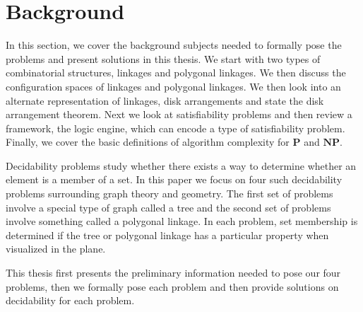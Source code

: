 \chapter{Background}
In this section, we cover the background subjects needed to formally pose the 
problems and present solutions in this thesis.  We start with two types of combinatorial structures, linkages 
and polygonal linkages.  We then discuss the configuration spaces of linkages and polygonal 
linkages.   We then look into an alternate representation of linkages, disk arrangements and state 
the disk arrangement theorem.  Next we look at satisfiability problems and then review a framework, the 
logic engine, which can encode a type of satisfiability problem.  Finally, we cover the basic 
definitions of algorithm complexity for $\textbf{P}$ and $\textbf{NP}$.

Decidability problems study whether there exists a way to determine whether an element is a member of a set.  In this paper we focus on four such decidability problems surrounding graph theory and geometry. The first set of problems involve a special type of graph called a tree and the second set of problems involve something called a polygonal linkage.  In each problem, set membership is determined if the tree or polygonal linkage has a particular property when visualized in the plane. 

This thesis first presents the preliminary information needed to pose our four problems, then we formally pose each problem and then provide solutions on decidability for each problem. 